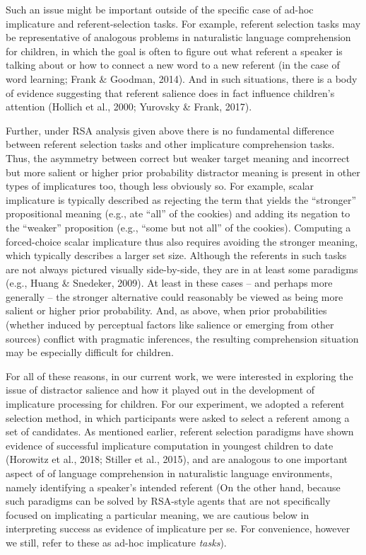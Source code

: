 \documentclass[man]{apa6}
\begin{document}
Such an issue might be important outside of the specific case of ad-hoc
implicature and referent-selection tasks. For example, referent
selection tasks may be representative of analogous problems in
naturalistic language comprehension for children, in which the goal is
often to figure out what referent a speaker is talking about or how to
connect a new word to a new referent (in the case of word learning;
Frank \& Goodman, 2014). And in such situations, there is a body of
evidence suggesting that referent salience does in fact influence
children's attention (Hollich et al., 2000; Yurovsky \& Frank, 2017).

Further, under RSA analysis given above there is no fundamental
difference between referent selection tasks and other implicature
comprehension tasks. Thus, the asymmetry between correct but weaker
target meaning and incorrect but more salient or higher prior
probability distractor meaning is present in other types of implicatures
too, though less obviously so. For example, scalar implicature is
typically described as rejecting the term that yields the
\enquote{stronger} propositional meaning (e.g., ate \enquote{all} of the
cookies) and adding its negation to the \enquote{weaker} proposition
(e.g., \enquote{some but not all} of the cookies). Computing a
forced-choice scalar implicature thus also requires avoiding the
stronger meaning, which typically describes a larger set size. Although
the referents in such tasks are not always pictured visually
side-by-side, they are in at least some paradigms (e.g., Huang \&
Snedeker, 2009). At least in these cases -- and perhaps more generally
-- the stronger alternative could reasonably be viewed as being more
salient or higher prior probability. And, as above, when prior
probabilities (whether induced by perceptual factors like salience or
emerging from other sources) conflict with pragmatic inferences, the
resulting comprehension situation may be especially difficult for
children.

For all of these reasons, in our current work, we were interested in
exploring the issue of distractor salience and how it played out in the
development of implicature processing for children. For our experiment,
we adopted a referent selection method, in which participants were asked
to select a referent among a set of candidates. As mentioned earlier,
referent selection paradigms have shown evidence of successful
implicature computation in youngest children to date (Horowitz et al.,
2018; Stiller et al., 2015), and are analogous to one important aspect
of of language comprehension in naturalistic language environments,
namely identifying a speaker's intended referent (On the other hand,
because such paradigms can be solved by RSA-style agents that are not
specifically focused on implicating a particular meaning, we are
cautious below in interpreting success as evidence of implicature per
se. For convenience, however we still, refer to these as ad-hoc
implicature \emph{tasks}).
\end{document}
